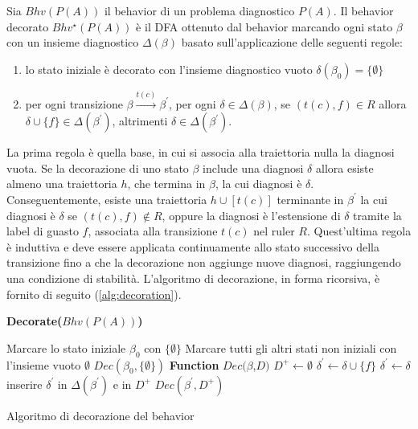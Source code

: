 \begin{defn}
Sia $Bhv(P(A))$ il behavior di un problema diagnostico $P(A)$. Il behavior decorato $Bhv^\star(P(A))$ è il DFA ottenuto dal behavior marcando ogni stato $\beta$ con un insieme diagnostico $\Delta(\beta)$ basato sull'applicazione delle seguenti regole:
\begin{enumerate}
\item lo stato iniziale è decorato con l'insieme diagnostico vuoto $\delta(\beta_0) = \{\emptyset\}$
\item per ogni transizione $\beta \xrightarrow{t(c)} \beta^\prime$, per ogni $\delta \in \Delta(\beta)$, se $(t(c),f) \in R$ allora $\delta \cup \{f\} \in \Delta(\beta^\prime)$, altrimenti $\delta \in \Delta(\beta^\prime)$.
\end{enumerate}
\end{defn}
La prima regola è quella base, in cui si associa alla traiettoria nulla la diagnosi vuota.
Se la decorazione di uno stato $\beta$ include una diagnosi $\delta$ allora esiste almeno una traiettoria $h$, che termina in $\beta$, la cui diagnosi è $\delta$. Conseguentemente, esiste una traiettoria $h \cup [t(c)]$ terminante in $\beta^\prime$ la cui diagnosi è $\delta$ se $(t(c),f) \notin R$, oppure la diagnosi è l'estensione di $\delta$ tramite la label di guasto $f$, associata alla transizione $t(c)$ nel ruler $R$. 
Quest'ultima regola è induttiva e deve essere applicata continuamente allo stato successivo della transizione fino a che la decorazione non aggiunge nuove diagnosi, raggiungendo una condizione di stabilità.
L'algoritmo di decorazione, in forma ricorsiva, è fornito di seguito (\ref{alg:decoration}).

\begin{algorithm}
\textbf{Decorate($Bhv(P(A))$)}
\begin{algorithmic}
\STATE Marcare lo stato iniziale $\beta_0$ con $\{\emptyset\}$ 
\STATE Marcare tutti gli altri stati non iniziali con l'insieme vuoto $\emptyset$
\STATE $Dec(\beta_0,\{\emptyset\})$
\STATE
\STATE \textbf{Function} $Dec(\beta$,$D)$
		\STATE $D^+ \leftarrow \emptyset$
				\STATE $\delta^\prime \leftarrow \delta \cup \{f\}$
			\ELSE
				\STATE $\delta^\prime \leftarrow \delta$
			\ENDIF
			\IF{$\delta^\prime \notin \Delta(\beta^\prime)$}
				\STATE inserire $\delta^\prime$ in $\Delta(\beta^\prime)$ e in $D^+$
			\ENDIF
		\ENDFOR
			\STATE $Dec(\beta^\prime, D^+)$
		\ENDIF
	\ENDFOR
\end{algorithmic}
\caption{Algoritmo di decorazione del behavior}
\label{alg:decoration}
\end{algorithm}

